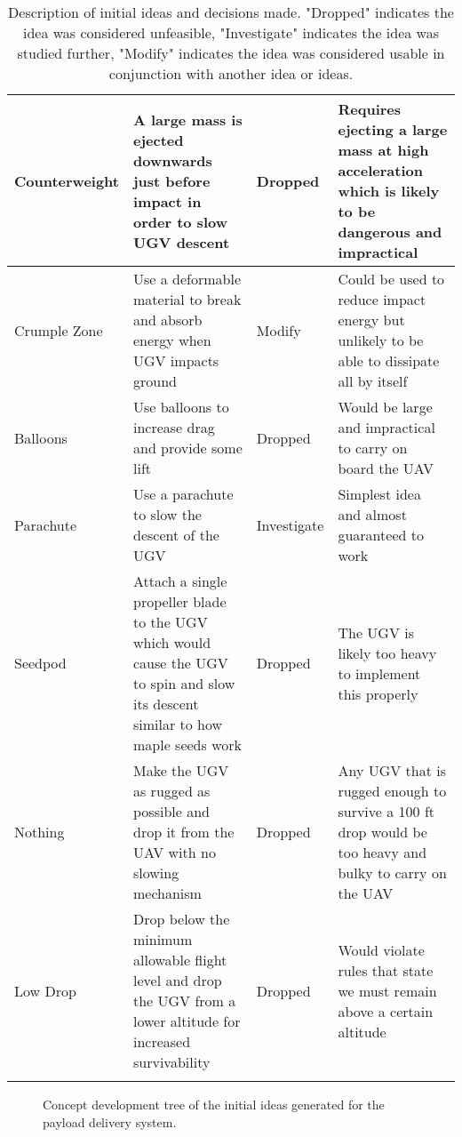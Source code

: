 \documentclass[]{auvsi_doc}
\begin{document}
\begin{longtable}[H]{|p{}|p{}|p{}|p{}|}
\hline
Counterweight & A large mass is ejected downwards just before impact in order to slow UGV descent & Dropped & Requires ejecting a large mass at high acceleration which is likely to be dangerous and impractical\\
\hline
Crumple Zone & Use a deformable material to break and absorb energy when UGV impacts ground & Modify & Could be used to reduce impact energy but unlikely to be able to dissipate all by itself\\
\hline
Balloons & Use balloons to increase drag and provide some lift & Dropped & Would be large and impractical to carry on board the UAV \\
\hline
Parachute & Use a parachute to slow the descent of the UGV & Investigate & Simplest idea and almost guaranteed to work \\
\hline
Seedpod & Attach a single propeller blade to the UGV which would cause the UGV to spin and slow its descent similar to how maple seeds work & Dropped & The UGV is likely too heavy to implement this properly\\
\hline
Nothing & Make the UGV as rugged as possible and drop it from the UAV with no slowing mechanism & Dropped & Any UGV that is rugged enough to survive a 100 ft drop would be too heavy and bulky to carry on the UAV \\
\hline
Low Drop & Drop below the minimum allowable flight level and drop the UGV from a lower altitude for increased survivability & Dropped & Would violate rules that state we must remain above a certain altitude\\
\hline

\caption{Description of initial ideas and decisions made. "Dropped" indicates the idea was considered unfeasible, "Investigate" indicates the idea was studied further, "Modify" indicates the idea was considered usable in conjunction with another idea or ideas. }
\end{longtable}



\begin{figure}
\centering
{}
\caption{Concept development tree of the initial ideas generated for the payload delivery system.}
\label{fig:ConceptTree}
\end{figure}
\end{document}
